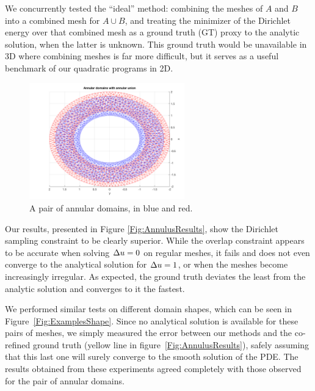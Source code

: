 \documentclass[11pt,a4paper, final, twoside]{article}
\theoremstyle{proposition}
\theoremstyle{definition}
\theoremstyle{remark}
\numberwithin{equation}{section}
\begin{document}
We concurrently tested the ``ideal'' method: combining the meshes of $A$ and $B$ into a combined mesh for $A \cup B$, and treating the minimizer of the Dirichlet energy over that combined mesh as a ground truth (GT) proxy to the analytic solution, when the latter is unknown. This ground truth would be unavailable in 3D where combining meshes is far more difficult, but it serves as a useful benchmark of our quadratic programs in 2D.

\begin{figure}[h]
\begin{center}
\includegraphics[width=0.6\textwidth]{annulusshape.png}
 \caption{A pair of annular domains, in blue and red.}
\label{Fig:AnnulusShape}
\end{center}
\end{figure}

Our results, presented in Figure \ref{Fig:AnnulusResults}, show the Dirichlet sampling constraint to be clearly superior. While the overlap constraint appears to be accurate when solving $\Delta u=0$ on regular meshes, it fails and does not even converge to the analytical solution for $\Delta u = 1$, or when the meshes become increasingly irregular. As expected, the ground truth deviates the least from the analytic solution and converges to it the fastest.

We performed similar tests on different domain shapes, which can be seen in Figure~\ref{Fig:ExamplesShape}. Since no analytical solution is available for these pairs of meshes, we simply measured the error between our methods and the co-refined ground truth (yellow line in figure~\ref{Fig:AnnulusResults}), safely assuming that this last one will surely converge to the smooth solution of the PDE. The results obtained from these experiments agreed completely with those observed for the pair of annular domains.

\newpage
\end{document}
